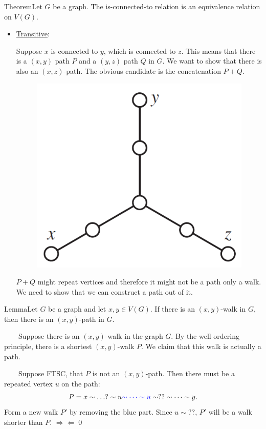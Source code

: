 \documentclass{beamer}
\def\bl[#1]#2{\begin{block}{#1}#2\end{block}}
\def\itemb{\begin{itemize}}
\def\iteme{\end{itemize}}
\begin{document}
\begin{frame}
\bl[Theorem]{Let $G$ be a graph. The is-connected-to relation is an equivalence relation on $V(G)$.}
\itemb
\item \underline{Transitive}:

Suppose $x$ is connected to $y$, which is connected to $z$. This means that there is a $(x,y)$ path $P$ and a $(y,z)$ path $Q$ in $G$. We want to show that there is also an $(x,z)$-path. The obvious candidate is the concatenation $P+Q$. 
\begin{figure}
\centering
\includegraphics[scale=0.22]{PathTrans.pdf}
\end{figure}

$P+Q$ might repeat vertices and therefore it might not be a path only a walk. We need to show that we can construct a path out of it.
\iteme
\end{frame}

\begin{frame}
\bl[Lemma]{Let $G$ be a graph and let $x,y\in V(G)$. If there is an $(x,y)$-walk in $G$, then there is an $(x,y)$-path in $G$.}
~~~~Suppose there is an $(x,y)$-walk in the graph $G$. By the well ordering principle, there is a shortest $(x,y)$-walk $P$. We claim that this walk is actually a path.

~~~~Suppose FTSC, that $P$ is not an $(x,y)$-path. Then there must be a repeated vertex $u$ on the path:
\[
P=x\sim\dots ? \sim u\textcolor{blue}{\sim\dots\sim u}\sim??\sim\dots\sim y.
\]
Form a new walk $P'$ by removing the blue part. Since $u\sim ??$, $P'$ will be a walk shorter than $P$. $\Rightarrow\Leftarrow$\qed
\end{frame}
\end{document}
